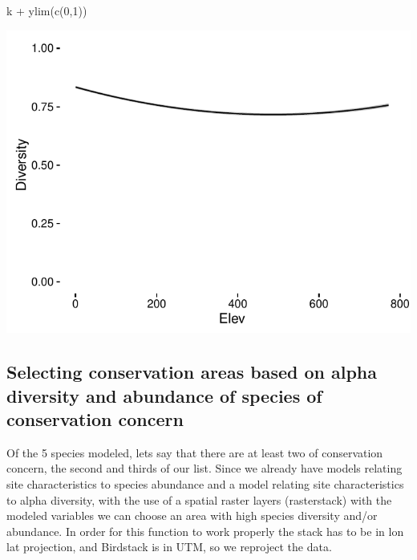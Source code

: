 \documentclass[article]{jss}
\begin{document}
\begin{CodeChunk}
\begin{CodeInput}
k + ylim(c(0,1))
\end{CodeInput}


\begin{center}\includegraphics{diversityocc_files/figure-latex/unnamed-chunk-20-3} \end{center}

\end{CodeChunk}

\subsection{Selecting conservation areas based on alpha diversity and
abundance of species of conservation
concern}\label{selecting-conservation-areas-based-on-alpha-diversity-and-abundance-of-species-of-conservation-concern}

Of the 5 species modeled, lets say that there are at least two of
conservation concern, the second and thirds of our list. Since we
already have models relating site characteristics to species abundance
and a model relating site characteristics to alpha diversity, with the
use of a spatial raster layers (rasterstack) with the modeled variables
we can choose an area with high species diversity and/or abundance. In
order for this function to work properly the stack has to be in lon lat
projection, and Birdstack is in UTM, so we reproject the data.
\end{document}
